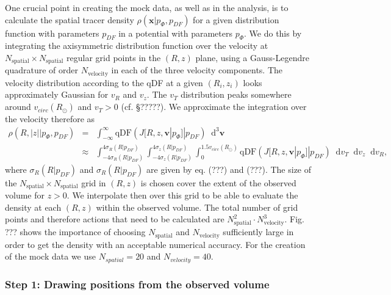 \documentclass[12pt,preprint]{aastex}
\newcommand{\vect}[1]{\boldsymbol{#1}} %
\newcommand*\diff{\mathop{}\!\mathrm{d}}
\newcommand*\Diff[1]{\mathop{}\!\mathrm{d^#1}}
\begin{document}
One crucial point in creating the mock data, as well as in the analysis, is to calculate the spatial tracer density $\rho(\vect{x}|p_{\Phi},p_{DF})$ for a given distribution function with parameters $p_{DF}$ in a potential with parameters $p_{\Phi}$. We do this by integrating the axisymmetric distribution function over the velocity at $N_\text{spatial} \times N_\text{spatial}$ regular grid points in the $(R,z)$ plane, using a Gauss-Legendre quadrature of order $N_\text{velocity}$ in each of the three velocity components. The velocity distribution according to the qDF at a given $(R_i,z_i)$ looks approximately Gaussian for $v_R$ and $v_z$. The $v_T$ distribution peaks somewhere around $v_{circ}(R_\odot)$ and $v_T > 0$ (cf. \S ?????). We approximate the integration over the velocity therefore as
\begin{eqnarray}
\rho(R,|z||p_{\Phi},p_{DF}) &=& \int_{-\infty}^{\infty} \text{qDF}(J[R,z,\vect{v}|p_{\Phi}]|p_{DF}) \Diff3\vect{v}\nonumber\\
&\approx& \int_{-4\sigma_R(R|p_{DF})}^{4\sigma_R(R|p_{DF})} \int_{-4\sigma_z(R|p_{DF})}^{4\sigma_z(R|p_{DF})} \int_{0}^{1.5 v_{circ}(R_\odot)}   \text{qDF}(J[R,z,\vect{v}|p_{\Phi}]|p_{DF}) \diff v_T \diff v_z \diff v_R, \label{eq:tracerdensity}
\end{eqnarray}
where $\sigma_R(R|p_{DF})$ and $\sigma_R(R|p_{DF})$ are given by eq. (???) and (???). The size of the $N_\text{spatial} \times N_\text{spatial}$ grid in $(R,z)$ is chosen cover the extent of the observed volume for $z>0$. We interpolate then over this grid to be able to evaluate the density at each $(R,z)$ within the observed volume. The total number of grid points and therefore actions that need to be calculated are $N_\text{spatial}^2 \cdot N_\text{velocity}^3$. Fig. ??? shows the importance of choosing $N_\text{spatial}$ and $N_\text{velocity}$ sufficiently large in order to get the density with an acceptable numerical accuracy. For the creation of the mock data we use $N_{spatial} = 20$ and $N_{velocity} = 40$.

\subsubsection{Step 1: Drawing positions from the observed volume}
\end{document}
